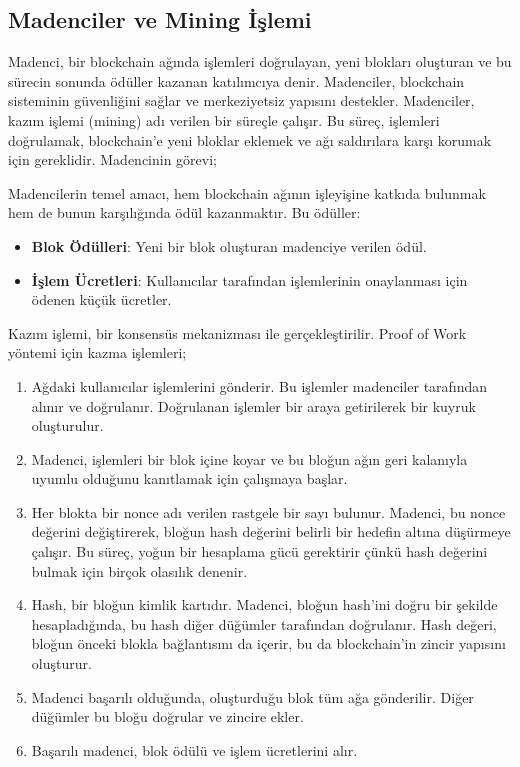 \subsection{Madenciler ve Mining İşlemi}

Madenci, bir blockchain ağında işlemleri doğrulayan, yeni blokları oluşturan ve bu sürecin sonunda ödüller kazanan katılımcıya denir. Madenciler, blockchain sisteminin güvenliğini sağlar ve merkeziyetsiz yapısını destekler. Madenciler, kazım işlemi (mining) adı verilen bir süreçle çalışır. Bu süreç, işlemleri doğrulamak, blockchain'e yeni bloklar eklemek ve ağı saldırılara karşı korumak için gereklidir. Madencinin görevi;

Madencilerin temel amacı, hem blockchain ağının işleyişine katkıda bulunmak hem de bunun karşılığında ödül kazanmaktır. Bu ödüller:

\begin{itemize}
    \item \textbf{Blok Ödülleri}: Yeni bir blok oluşturan madenciye verilen ödül.
    \item \textbf{İşlem Ücretleri}: Kullanıcılar tarafından işlemlerinin onaylanması için ödenen küçük ücretler.
\end{itemize}

Kazım işlemi, bir konsensüs mekanizması ile gerçekleştirilir. Proof of Work yöntemi için kazma işlemleri;

\begin{enumerate}
    \item Ağdaki kullanıcılar işlemlerini gönderir. Bu işlemler madenciler tarafından alınır ve doğrulanır. Doğrulanan işlemler bir araya getirilerek bir kuyruk oluşturulur.
    \item Madenci, işlemleri bir blok içine koyar ve bu bloğun ağın geri kalanıyla uyumlu olduğunu kanıtlamak için çalışmaya başlar.
    \item Her blokta bir nonce adı verilen rastgele bir sayı bulunur. Madenci, bu nonce değerini değiştirerek, bloğun hash değerini belirli bir hedefin altına düşürmeye çalışır. Bu süreç, yoğun bir hesaplama gücü gerektirir çünkü hash değerini bulmak için birçok olasılık denenir.
    \item Hash, bir bloğun kimlik kartıdır. Madenci, bloğun hash'ini doğru bir şekilde hesapladığında, bu hash diğer düğümler tarafından doğrulanır. Hash değeri, bloğun önceki blokla bağlantısını da içerir, bu da blockchain'in zincir yapısını oluşturur.
    \item Madenci başarılı olduğunda, oluşturduğu blok tüm ağa gönderilir. Diğer düğümler bu bloğu doğrular ve zincire ekler.
    \item Başarılı madenci, blok ödülü ve işlem ücretlerini alır.
\end{enumerate}


\newpage